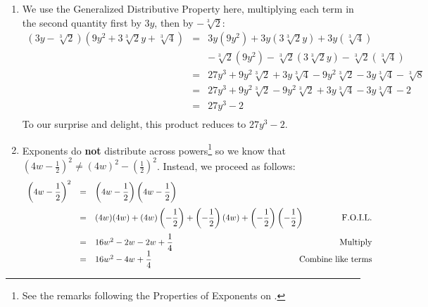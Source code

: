 \documentclass{ximera}
\begin{document}
\begin{ex}
\begin{enumerate}
\item  We use the Generalized Distributive Property here, multiplying each term in the second quantity first by $3y$, then by $-\sqrt[3]{2}$:\[ \begin{array}{rclr}

\left(3y - \sqrt[3]{2}\right)\left(9y^2 + 3\sqrt[3]{2} y + \sqrt[3]{4}\right) & = & 3y\left(9y^2\right) +3y\left(3\sqrt[3]{2} y\right) + 3y\left(\sqrt[3]{4}\right) & \\
       & & -\sqrt[3]{2} \left(9y^2\right) - \sqrt[3]{2} \left(3\sqrt[3]{2} y\right) -\sqrt[3]{2} \left(\sqrt[3]{4}\right) & \\
			  & = & 27y^3 + 9y^2 \sqrt[3]{2} + 3y \sqrt[3]{4} - 9y^2\sqrt[3]{2} - 3y \sqrt[3]{4} - \sqrt[3]{8} & \\
				& = & 27y^3 + 9y^2 \sqrt[3]{2} - 9y^2 \sqrt[3]{2} + 3y \sqrt[3]{4} - 3y \sqrt[3]{4} - 2 & \\
				& = & 27y^3 - 2 \\ 

\end{array} \] To our surprise and delight, this product reduces to $27y^3 - 2$.

\item Exponents do \textbf{not} distribute across powers\footnote{See the remarks following the Properties of Exponents on \pageref{propertiesofintegerexponents}.} so we know that  $\left(4w - \frac{1}{2} \right)^2 \neq (4w)^2 - \left(\frac{1}{2}\right)^2$.  Instead, we proceed as follows:\[ \begin{array}{rclr}

\left(4w - \dfrac{1}{2} \right)^2 & = & \left(4w - \dfrac{1}{2} \right)\left(4w - \dfrac{1}{2} \right) & \hspace*{-.2in} \\[12pt]
                                 & = & (4w)(4w) + (4w)\left(-\dfrac{1}{2}\right) + \left(-\dfrac{1}{2}\right)(4w) + \left(-\dfrac{1}{2}\right)\left(-\dfrac{1}{2}\right) & \hspace*{-.2in} \text{F.O.I.L.} \\[12pt]
																
																& = & 16w^2 - 2w - 2w + \dfrac{1}{4} & \hspace*{-.2in} \text{Multiply} \\ 
                                & = & 16w^2 - 4w + \dfrac{1}{4} & \hspace*{-.2in} \text{Combine like terms} \\ 
\end{array}\]


\end{enumerate}
\end{ex}
\end{document}
